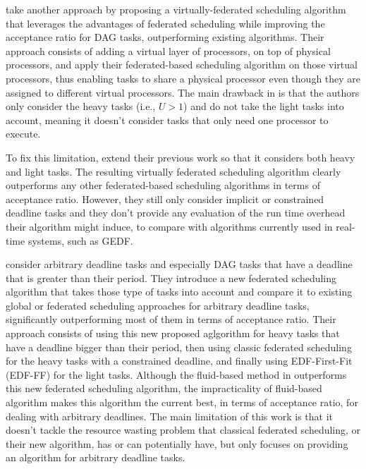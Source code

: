 \citet{JiangVirtuallyFederatedSched2021}
take another approach by proposing a virtually-federated 
scheduling algorithm that leverages the advantages
of federated scheduling while improving the acceptance 
ratio for DAG tasks, outperforming existing algorithms.
Their approach consists of adding a virtual layer
of processors, on top of physical processors,
and apply their federated-based scheduling algorithm on those virtual processors,
thus enabling tasks to share a physical processor
even though they are assigned to different virtual processors.
The main drawback in \cite{JiangVirtuallyFederatedSched2021}
is that the authors only consider the heavy tasks (i.e., $U > 1$)
and do not take the light tasks into account,
meaning it doesn't consider tasks that only need 
one processor to execute.

To fix this limitation, \citet{Jiang2023SchedVirtualProcs}
extend their previous work\cite{JiangVirtuallyFederatedSched2021}
so that it considers both heavy and light tasks.
The resulting virtually federated scheduling algorithm
clearly outperforms any other federated-based scheduling algorithms
in terms of acceptance ratio.
However, they still only consider implicit or constrained deadline tasks
and they don't provide any evaluation of the run time overhead 
their algorithm might induce, to compare with algorithms currently used
in real-time systems, such as GEDF.


\citet{Guan2023FederatedNew} 
consider arbitrary deadline tasks and especially
DAG tasks that have a deadline that is greater than their period.
They introduce a new federated scheduling algorithm 
that takes those type of tasks into account 
and compare it to existing global or federated scheduling approaches
for arbitrary deadline tasks, significantly outperforming
most of them in terms of acceptance ratio.
Their approach consists of using this new proposed aglgorithm 
for heavy tasks that have a deadline bigger than their period,
then using classic federated scheduling for the heavy tasks with a 
constrained deadline, and finally using EDF-First-Fit (EDF-FF) for the light tasks.
Although the fluid-based method in \cite{GuanFluidDag2022}
outperforms this new federated scheduling algorithm,
the impracticality of fluid-based algorithm makes this algorithm
the current best, in terms of acceptance ratio, for dealing with arbitrary
deadlines. The main limitation of this work 
is that it doesn't tackle the resource wasting problem 
that classical federated scheduling, or their new algorithm, has or can potentially have, but only
focuses on providing an algorithm for arbitrary deadline tasks.

